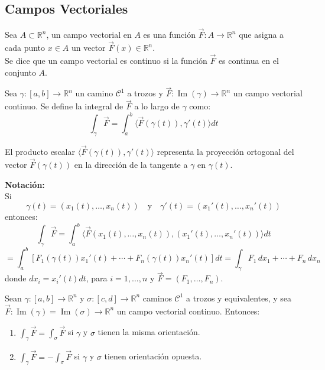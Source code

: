 \subsection{Campos Vectoriales}

\begin{definición} 
Sea $A \subset \mathbb{R}^n$, un campo vectorial en $A$ es una función $\vec{F} : A \to \mathbb{R}^n$ que asigna a cada punto $x \in A$ un vector $\vec{F}(x) \in \mathbb{R}^n$.\\
Se dice que un campo vectorial es continuo si la función $\vec{F}$ es continua en el conjunto $A$.
\end{definición}
\begin{definición} 
Sea $\gamma : [a, b] \to \mathbb{R}^n$ un camino $\mathcal{C}^1$ a trozos y $\vec{F} : \operatorname{Im}(\gamma) \to \mathbb{R}^n$ un campo vectorial continuo. Se define la integral de $\vec{F}$ a lo largo de $\gamma$ como:
\[
    \int_\gamma \vec{F} = \int_a^b \langle \vec{F}(\gamma(t)), \gamma'(t) \rangle dt
\]
\end{definición}

\begin{observación}
El producto escalar $\langle \vec{F}(\gamma(t)), \gamma'(t) \rangle$ representa la proyección ortogonal del vector $\vec{F}(\gamma(t))$ en la dirección de la tangente a $\gamma \text{ en } \gamma(t)$.

\end{observación}

\textbf{Notación:}\\
Si
\[
    \gamma(t) = (x_1(t), \ldots, x_n(t)) \quad \text{y} \quad \gamma'(t) = (x_1'(t), \ldots, x_n'(t))
\]
entonces:
\[
    \int_\gamma \vec{F} = \int_a^b \langle \vec{F}(x_1(t), \ldots, x_n(t)), (x_1'(t), \ldots, x_n'(t)) \rangle dt
\]
\[
    = \int_a^b \left[ F_1(\gamma(t)) x_1'(t) + \cdots + F_n(\gamma(t)) x_n'(t) \right] dt = \int_\gamma F_1 \, dx_1 + \cdots + F_n \, dx_n
\]
donde $dx_i = x_i'(t) dt$, para $i = 1, \ldots, n$ y $\vec{F} = (F_1, \ldots,
    F_n)$.\\

\begin{teorema}
    Sean $\gamma : [a, b] \to \mathbb{R}^n$ y $\sigma : [c, d] \to \mathbb{R}^n$ caminos $\mathcal{C}^1$ a trozos y equivalentes, y sea $\vec{F} : \operatorname{Im}(\gamma) = \operatorname{Im}(\sigma) \to \mathbb{R}^n$ un campo vectorial continuo. Entonces:
    \vspace{-0.5em}
    \begin{enumerate}
        \item $\displaystyle \int_\gamma \vec{F} = \int_\sigma \vec{F}$ \quad si $\gamma$ y $\sigma$ tienen la misma orientación.
        \item $\displaystyle \int_\gamma \vec{F} = - \int_\sigma \vec{F}$ \quad si $\gamma$ y $\sigma$ tienen orientación opuesta.
    \end{enumerate}
\end{teorema}

